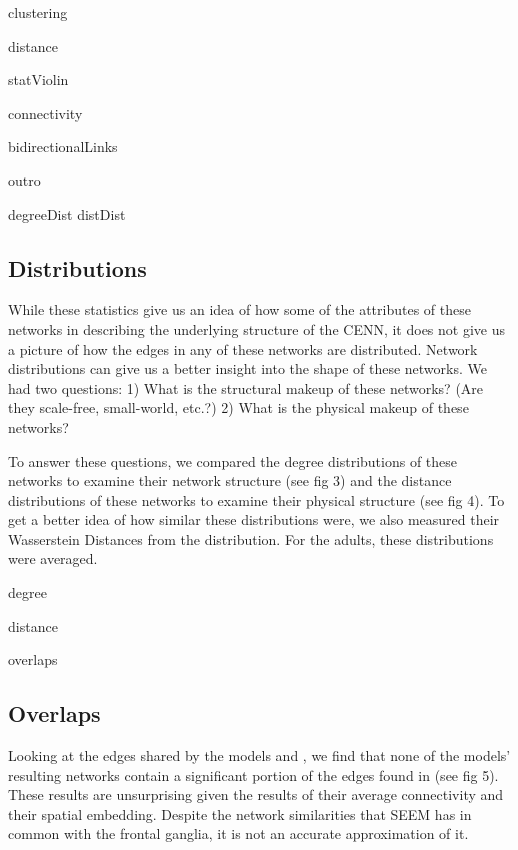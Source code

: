 {clustering}


{distance}

{statViolin}

{connectivity}

{bidirectionalLinks}


{outro}


{degreeDist}
{distDist}

\subsection{Distributions}

While these statistics give us an idea of how some of the attributes of these networks in describing the underlying structure of the CENN, it does not give us a picture of how the edges in any of these networks are distributed. 
Network distributions can give us a better insight into the shape of these networks.
We had two questions: 
1) What is the structural makeup of these networks? (Are they scale-free, small-world, etc.?) 
2) What is the physical makeup of these networks?

To answer these questions, we compared the degree distributions of these networks to examine their network structure (see fig 3) and the distance distributions of these networks to examine their physical structure (see fig 4). 
To get a better idea of how similar these distributions were, we also measured their Wasserstein Distances from the \ce distribution. 
For the adults, these distributions were averaged.

{degree}

{distance}

{overlaps}

\subsection{Overlaps}
Looking at the edges shared by the models and \ce, we find that none of the models' resulting networks contain a significant portion of the edges found in \ce (see fig 5). 
These results are unsurprising given the results of their average connectivity and their spatial embedding.
Despite the network similarities that SEEM has in common with the \ce frontal ganglia, it is not an accurate approximation of it.

